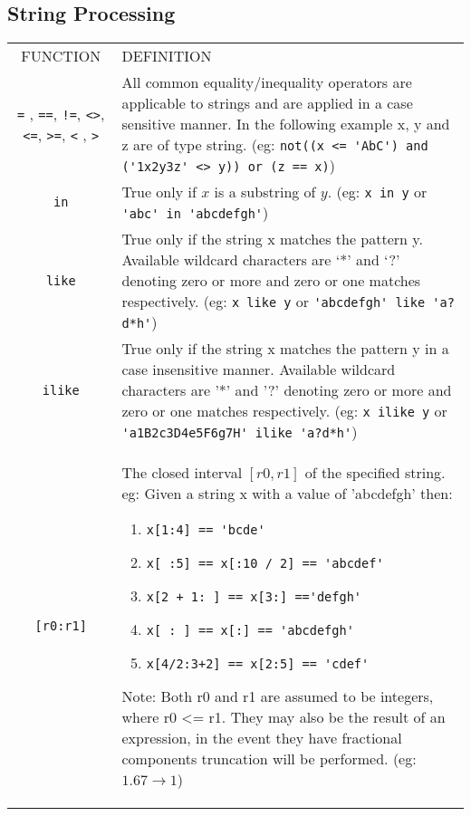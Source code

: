 \subsection{String Processing}
\begin{tabular}{|c|p{}|}
\hline
FUNCTION& DEFINITION\\
\verb'=' , \verb'==', \verb'!=', \verb'<>', \verb'<=', \verb'>=', \verb'<' , \verb'>'& All common equality/inequality operators are applicable to strings and are applied in a case sensitive manner. In the following example x, y and z are of type string. (eg: \verb"not((x <= 'AbC') and ('1x2y3z' <> y)) or (z == x)")\\
\verb'in'& True only if $x$ is a substring of $y$. (eg: \verb'x in y' or \verb"'abc' in 'abcdefgh'")\\
\verb'like'& True only if the string x matches the pattern y.  Available wildcard characters are `*' and `?' denoting  zero or more and zero or one matches respectively.   (eg: \verb'x like y' or \verb"'abcdefgh' like 'a?d*h'")\\ 
\verb'ilike'& True only if the string x matches the pattern y in a case insensitive manner. Available wildcard characters are '*' and '?' denoting zero or more and zero or one  matches respectively. (eg: \verb'x ilike y' or \verb"'a1B2c3D4e5F6g7H' ilike 'a?d*h'")\\
\verb'[r0:r1]'& The closed interval $[r0,r1]$ of the specified string.
eg: Given a string x with a value of 'abcdefgh' then:
\begin{enumerate}
\item \verb"x[1:4] == 'bcde'"
\item \verb"x[ :5] == x[:10 / 2] == 'abcdef'"
\item \verb"x[2 + 1: ] == x[3:] =='defgh'"
\item \verb"x[ : ] == x[:] == 'abcdefgh'"
\item \verb"x[4/2:3+2] == x[2:5] == 'cdef'"
\end{enumerate}
 Note: Both r0 and r1 are assumed to be integers, where r0 <= r1. They
 may also be the result of an expression, in the event they have
 fractional components truncation will be performed. (eg: $1.67
                \rightarrow 1$)\\
  \hline
\end{tabular}

